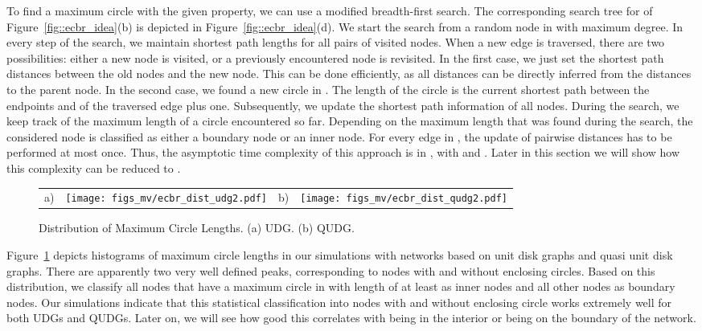 \documentclass{llncs}
\begin{document}
To find a maximum circle with the given property, we can use a modified breadth-first search.
The corresponding search tree for  of Figure~\ref{fig::ecbr_idea}(b) is depicted in Figure~\ref{fig::ecbr_idea}(d).
We start the search from a random node  in  with maximum degree.
In every step of the search, we maintain shortest path lengths for all pairs of visited nodes.
When a new edge is traversed, there are two possibilities: either a new node is visited, or a previously encountered node is revisited.
In the first case, we just set the shortest path distances between the old nodes and the new node.
This can be done efficiently, as all distances can be directly inferred from the distances to the parent node.
In the second case, we found a new circle in .
The length of the circle is the current shortest path between the endpoints  and  of the traversed edge  plus one.
Subsequently, we update the shortest path information of all nodes.
During the search, we keep track of the maximum length of a circle encountered so far.
Depending on the maximum length that was found during the search, the considered node is classified as either a boundary node or an inner node.
For every edge in , the update of pairwise distances has to be performed at most once.
Thus, the asymptotic time complexity of this approach is in , with  and .
Later in this section we will show how this complexity can be reduced to .

\begin{figure}[t]
\centering
\begin{tabular}{llll}
 a) \hspace{0.2cm} &
\parbox[c]{.23\columnwidth}{\texttt{[image: figs\_mv/ecbr\_dist\_udg2.pdf]}} &
\hspace{0.8cm}  b) \hspace{0.2cm} &
\parbox[c]{.23\columnwidth}{\texttt{[image: figs\_mv/ecbr\_dist\_qudg2.pdf]}}
\end{tabular}
\caption{Distribution of Maximum Circle Lengths. (a) UDG. (b) QUDG.}
\label{fig::circle_length}
\end{figure}
Figure~\ref{fig::circle_length} depicts histograms of maximum circle lengths in our simulations with networks based on unit disk graphs and quasi unit disk graphs. There are apparently two very well defined peaks, corresponding to nodes with and without enclosing circles.
Based on this distribution, we classify all nodes  that have a maximum circle in  with length of at least  as inner nodes and all other nodes as boundary nodes.
Our simulations indicate that this statistical classification into nodes with and without enclosing circle works extremely well for both UDGs and QUDGs.
Later on, we will see how good this correlates with being in the interior or being on the boundary of the network.
\end{document}
